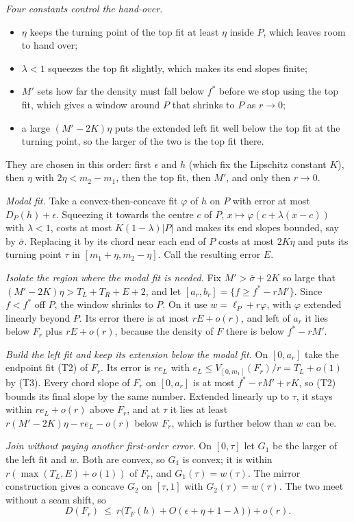 \smallskip\noindent\emph{Four constants control the hand-over.}
\begin{itemize}[leftmargin=*,itemsep=1pt]
\item $\eta$ keeps the turning point of the top fit at least $\eta$ inside $P$, which leaves room to hand over;
\item $\lambda<1$ squeezes the top fit slightly, which makes its end slopes finite;
\item $M'$ sets how far the density must fall below $f^*$ before we stop using the top fit, which gives a window around $P$ that shrinks to $P$ as $r\to0$;
\item a large $(M'-2K)\eta$ puts the extended left fit well below the top fit at the turning point, so the larger of the two is the top fit there.
\end{itemize}
They are chosen in this order: first $\epsilon$ and $h$ (which fix the Lipschitz constant $K$), then $\eta$ with $2\eta<m_2-m_1$, then the top fit, then $M'$, and only then $r\to0$.
\medskip
\begin{steps}
\item \emph{Modal fit.} Take a convex-then-concave fit $\varphi$ of $h$ on $P$ with error at most $D_P(h)+\epsilon$. Squeezing it towards the centre $c$ of $P$, $x\mapsto\varphi(c+\lambda(x-c))$ with $\lambda<1$, costs at most $K(1-\lambda)|P|$ and makes its end slopes bounded, say by $\bar\sigma$. Replacing it by its chord near each end of $P$ costs at most $2K\eta$ and puts its turning point $\tau$ in $[m_1+\eta,m_2-\eta]$. Call the resulting error $E$.
\item \emph{Isolate the region where the modal fit is needed.} Fix $M'>\bar\sigma+2K$ so large that $(M'-2K)\eta>T_L+T_R+E+2$, and let $[a_r,b_r]=\{f\ge f^*-rM'\}$. Since $f<f^*$ off $P$, the window shrinks to $P$. On it use $w=\ell_P+r\varphi$, with $\varphi$ extended linearly beyond $P$. Its error there is at most $rE+o(r)$, and left of $a_r$ it lies below $F_r$ plus $rE+o(r)$, because the density of $F$ there is below $f^*-rM'$.
\item \emph{Build the left fit and keep its extension below the modal fit.} On $[0,a_r]$ take the endpoint fit (T2) of $F_r$. Its error is $re_L$ with $e_L\le V_{[0,m_1]}(F_r)/r=T_L+o(1)$ by (T3). Every chord slope of $F_r$ on $[0,a_r]$ is at most $f^*-rM'+rK$, so (T2) bounds its final slope by the same number. Extended linearly up to $\tau$, it stays within $re_L+o(r)$ above $F_r$, and at $\tau$ it lies at least $r(M'-2K)\eta-re_L-o(r)$ below $F_r$, which is further below than $w$ can be.
\item \emph{Join without paying another first-order error.} On $[0,\tau]$ let $G_1$ be the larger of the left fit and $w$. Both are convex, so $G_1$ is convex; it is within $r(\max(T_L,E)+o(1))$ of $F_r$, and $G_1(\tau)=w(\tau)$. The mirror construction gives a concave $G_2$ on $[\tau,1]$ with $G_2(\tau)=w(\tau)$. The two meet without a seam shift, so
\[
D(F_r)\ \le\ r\bigl(T_F(h)+O(\epsilon+\eta+1-\lambda)\bigr)+o(r).
\]
\end{steps}

